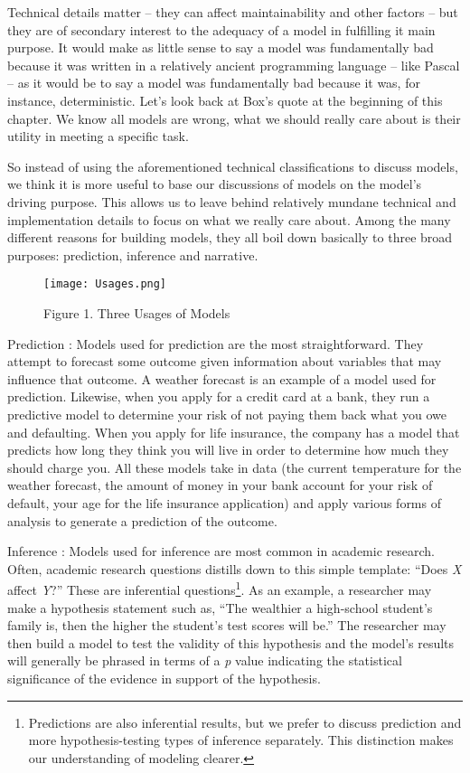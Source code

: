 \documentclass[]{memoir}
\makeatletter
\def\maxwidth{\ifdim\Gin@nat@width>\linewidth\linewidth
\else\Gin@nat@width\fi}
\let\Oldincludegraphics\includegraphics
\renewcommand{\includegraphics}[1]{\Oldincludegraphics[width=\maxwidth]{#1}}
\makeatother
\begin{document}
Technical details matter -- they can affect maintainability and other
factors -- but they are of secondary interest to the adequacy of a model
in fulfilling it main purpose. It would make as little sense to say a
model was fundamentally bad because it was written in a relatively
ancient programming language -- like Pascal -- as it would be to say a
model was fundamentally bad because it was, for instance, deterministic.
Let's look back at Box's quote at the beginning of this chapter. We know
all models are wrong, what we should really care about is their utility
in meeting a specific task.

So instead of using the aforementioned technical classifications to
discuss models, we think it is more useful to base our discussions of
models on the model's driving purpose. This allows us to leave behind
relatively mundane technical and implementation details to focus on what
we really care about. Among the many different reasons for building
models, they all boil down basically to three broad purposes:
prediction, inference and narrative.

\begin{figure}[htbp]
\centering
\texttt{[image: Usages.png]}
\caption{Figure 1. Three Usages of Models}
\end{figure}

Prediction : Models used for prediction are the most straightforward.
They attempt to forecast some outcome given information about variables
that may influence that outcome. A weather forecast is an example of a
model used for prediction. Likewise, when you apply for a credit card at
a bank, they run a predictive model to determine your risk of not paying
them back what you owe and defaulting. When you apply for life
insurance, the company has a model that predicts how long they think you
will live in order to determine how much they should charge you. All
these models take in data (the current temperature for the weather
forecast, the amount of money in your bank account for your risk of
default, your age for the life insurance application) and apply various
forms of analysis to generate a prediction of the outcome.

Inference : Models used for inference are most common in academic
research. Often, academic research questions distills down to this
simple template: ``Does \emph{X} affect \emph{Y}?'' These are
inferential questions\footnote{Predictions are also inferential results,
  but we prefer to discuss prediction and more hypothesis-testing types
  of inference separately. This distinction makes our understanding of
  modeling clearer.}. As an example, a researcher may make a hypothesis
statement such as, ``The wealthier a high-school student's family is,
then the higher the student's test scores will be.'' The researcher may
then build a model to test the validity of this hypothesis and the
model's results will generally be phrased in terms of a \emph{p} value
indicating the statistical significance of the evidence in support of
the hypothesis.
\end{document}
